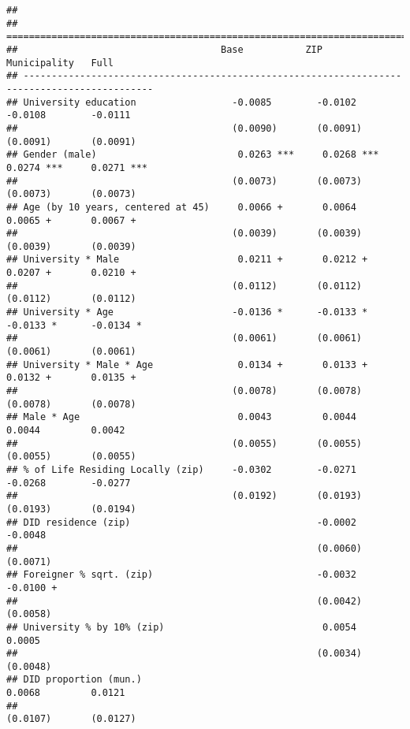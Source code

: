 \documentclass[
]{article}
\begin{document}
\begin{verbatim}
## 
## =============================================================================================
##                                    Base           ZIP            Municipality   Full         
## ---------------------------------------------------------------------------------------------
## University education                 -0.0085        -0.0102        -0.0108        -0.0111    
##                                      (0.0090)       (0.0091)       (0.0091)       (0.0091)   
## Gender (male)                         0.0263 ***     0.0268 ***     0.0274 ***     0.0271 ***
##                                      (0.0073)       (0.0073)       (0.0073)       (0.0073)   
## Age (by 10 years, centered at 45)     0.0066 +       0.0064         0.0065 +       0.0067 +  
##                                      (0.0039)       (0.0039)       (0.0039)       (0.0039)   
## University * Male                     0.0211 +       0.0212 +       0.0207 +       0.0210 +  
##                                      (0.0112)       (0.0112)       (0.0112)       (0.0112)   
## University * Age                     -0.0136 *      -0.0133 *      -0.0133 *      -0.0134 *  
##                                      (0.0061)       (0.0061)       (0.0061)       (0.0061)   
## University * Male * Age               0.0134 +       0.0133 +       0.0132 +       0.0135 +  
##                                      (0.0078)       (0.0078)       (0.0078)       (0.0078)   
## Male * Age                            0.0043         0.0044         0.0044         0.0042    
##                                      (0.0055)       (0.0055)       (0.0055)       (0.0055)   
## % of Life Residing Locally (zip)     -0.0302        -0.0271        -0.0268        -0.0277    
##                                      (0.0192)       (0.0193)       (0.0193)       (0.0194)   
## DID residence (zip)                                 -0.0002                       -0.0048    
##                                                     (0.0060)                      (0.0071)   
## Foreigner % sqrt. (zip)                             -0.0032                       -0.0100 +  
##                                                     (0.0042)                      (0.0058)   
## University % by 10% (zip)                            0.0054                        0.0005    
##                                                     (0.0034)                      (0.0048)   
## DID proportion (mun.)                                               0.0068         0.0121    
##                                                                    (0.0107)       (0.0127)   

\end{verbatim}
\end{document}
